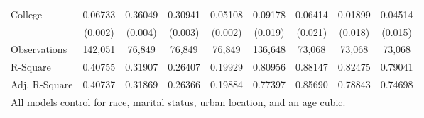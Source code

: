 \documentclass[border=3mm,preview]{standalone}
\begin{document}
\begin{landscape}
\begin{table}
\begin{tabular}{l*{8}{c}}
College             &     0.06733\sym{***}&     0.36049\sym{***}&     0.30941\sym{***}&     0.05108\sym{***}&     0.09178\sym{***}&     0.06414\sym{**} &     0.01899         &     0.04514\sym{**} \\
                    &     (0.002)         &     (0.004)         &     (0.003)         &     (0.002)         &     (0.019)         &     (0.021)         &     (0.018)         &     (0.015)         \\
\bottomrule
Observations        &     142,051         &     76,849          &     76,849          &     76,849          &     136,648          &     73,068         &     73,068          &     73,068         \\
R-Square            &     0.40755         &     0.31907         &     0.26407         &     0.19929         &     0.80956         &     0.88147         &     0.82475         &     0.79041         \\
Adj. R-Square       &     0.40737         &     0.31869         &     0.26366         &     0.19884         &     0.77397         &     0.85690         &     0.78843         &     0.74698         \\
\bottomrule
\multicolumn{9}{l}{\small{All models control for race, marital status, urban location, and an age cubic.}} \\
\end{tabular}
\end{table}
\end{landscape}
\end{document}
